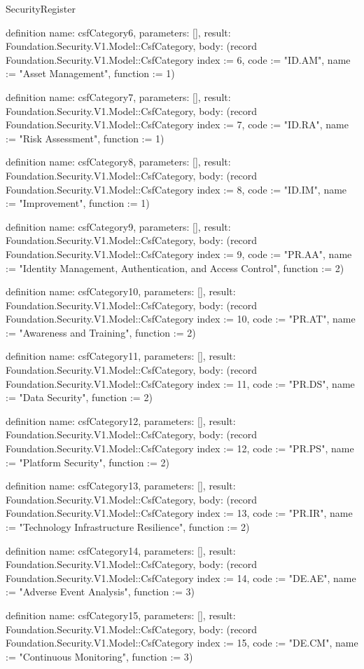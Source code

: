 \begin{lexlean}{SecurityRegister}
\begin{semanticmodule}
definition{
  name: csfCategory6,
  parameters: [],
  result: Foundation.Security.V1.Model::CsfCategory,
  body: (record Foundation.Security.V1.Model::CsfCategory {index := 6, code := "ID.AM", name := "Asset Management", function := 1})
}

definition{
  name: csfCategory7,
  parameters: [],
  result: Foundation.Security.V1.Model::CsfCategory,
  body: (record Foundation.Security.V1.Model::CsfCategory {index := 7, code := "ID.RA", name := "Risk Assessment", function := 1})
}

definition{
  name: csfCategory8,
  parameters: [],
  result: Foundation.Security.V1.Model::CsfCategory,
  body: (record Foundation.Security.V1.Model::CsfCategory {index := 8, code := "ID.IM", name := "Improvement", function := 1})
}

definition{
  name: csfCategory9,
  parameters: [],
  result: Foundation.Security.V1.Model::CsfCategory,
  body: (record Foundation.Security.V1.Model::CsfCategory {index := 9, code := "PR.AA", name := "Identity Management, Authentication, and Access Control", function := 2})
}

definition{
  name: csfCategory10,
  parameters: [],
  result: Foundation.Security.V1.Model::CsfCategory,
  body: (record Foundation.Security.V1.Model::CsfCategory {index := 10, code := "PR.AT", name := "Awareness and Training", function := 2})
}

definition{
  name: csfCategory11,
  parameters: [],
  result: Foundation.Security.V1.Model::CsfCategory,
  body: (record Foundation.Security.V1.Model::CsfCategory {index := 11, code := "PR.DS", name := "Data Security", function := 2})
}

definition{
  name: csfCategory12,
  parameters: [],
  result: Foundation.Security.V1.Model::CsfCategory,
  body: (record Foundation.Security.V1.Model::CsfCategory {index := 12, code := "PR.PS", name := "Platform Security", function := 2})
}

definition{
  name: csfCategory13,
  parameters: [],
  result: Foundation.Security.V1.Model::CsfCategory,
  body: (record Foundation.Security.V1.Model::CsfCategory {index := 13, code := "PR.IR", name := "Technology Infrastructure Resilience", function := 2})
}

definition{
  name: csfCategory14,
  parameters: [],
  result: Foundation.Security.V1.Model::CsfCategory,
  body: (record Foundation.Security.V1.Model::CsfCategory {index := 14, code := "DE.AE", name := "Adverse Event Analysis", function := 3})
}

definition{
  name: csfCategory15,
  parameters: [],
  result: Foundation.Security.V1.Model::CsfCategory,
  body: (record Foundation.Security.V1.Model::CsfCategory {index := 15, code := "DE.CM", name := "Continuous Monitoring", function := 3})
}


\end{semanticmodule}
\end{lexlean}

